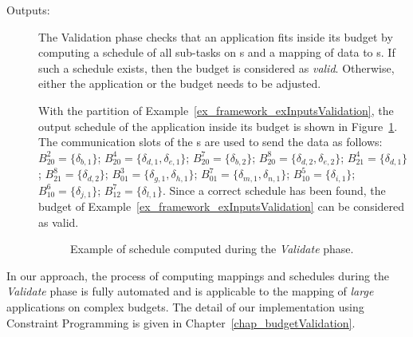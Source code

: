 \documentclass[main.tex]{subfiles}
\begin{document}
\begin{description}
    \item[Outputs: ]
        The Validation phase checks that an application fits inside its budget by computing a schedule of all sub-tasks on \PN{}s and a mapping of data to \PC{}s. If such a schedule exists, then the budget is considered as \emph{valid}. Otherwise, either the application or the budget needs to be adjusted.   
        \begin{example}
            With the partition of Example~\ref{ex_framework_exInputsValidation}, the output schedule of the application inside its budget is shown in Figure~\ref{fig_framework_exOutputValidation}. The communication slots of the \PC{}s are used to send the data as follows:
            $B_{20}^2 = \{ \delta_{b,1} \}$;
            $B_{20}^4 = \{ \delta_{d,1}, \delta_{e,1} \}$;
            $B_{20}^7 = \{ \delta_{b,2} \}$;
            $B_{20}^8 = \{ \delta_{d,2}, \delta_{e,2} \}$;
            $B_{21}^4 = \{ \delta_{d,1} \}$;
            $B_{21}^8 = \{ \delta_{d,2} \}$;
            $B_{01}^3 = \{ \delta_{g,1} , \delta_{h,1}\}$;
            $B_{01}^7 = \{ \delta_{m,1} , \delta_{n,1}\}$;
            $B_{10}^5 = \{ \delta_{i,1} \}$;
            $B_{10}^6 = \{ \delta_{j,1} \}$;
            $B_{12}^7 = \{ \delta_{l,1} \}$.
            Since a correct schedule has been found, the budget of Example~\ref{ex_framework_exInputsValidation} can be considered as valid.
            \begin{figure}
                \centering
                \scalebox{0.8}{}
                \caption{Example of schedule computed during the \emph{Validate} phase.}
                \label{fig_framework_exOutputValidation}
            \end{figure}
        \end{example}
\end{description}

In our approach, the process of computing mappings and schedules during the \emph{Validate} phase is fully automated and is applicable to the mapping of \emph{large} applications on complex budgets. The detail of our implementation using Constraint Programming is given in Chapter~\ref{chap_budgetValidation}.
\end{document}
